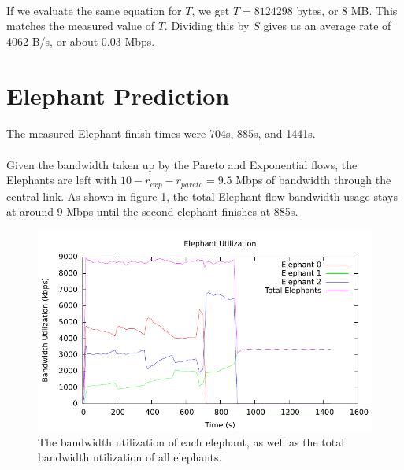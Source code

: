 \documentclass{article}
\begin{document}
\paragraph{}
If we evaluate the same equation for $T$, we get $T = 8124298$ bytes, or 8 MB. This matches the measured value of $T$.
Dividing this by $S$ gives us an average rate of 4062 B/s, or about 0.03 Mbps.

\section{Elephant Prediction}

\paragraph{}
The measured Elephant finish times were 704s, 885s, and 1441s.

\paragraph{}
Given the bandwidth taken up by the Pareto and Exponential flows, the Elephants are left with $10 - r_{exp} - r_{pareto} = 9.5$ Mbps of bandwidth through the central link.
As shown in figure \ref{fig:elephant_bw}, the total Elephant flow bandwidth usage stays at around 9 Mbps until the second elephant finishes at 885s.
\begin{figure}[h]
  \begin{center}
    \includegraphics{elephant_bw}
    \caption{The bandwidth utilization of each elephant, as well as the total bandwidth utilization of all elephants.}
    \label{fig:elephant_bw}
  \end{center}
\end{figure}
\end{document}
